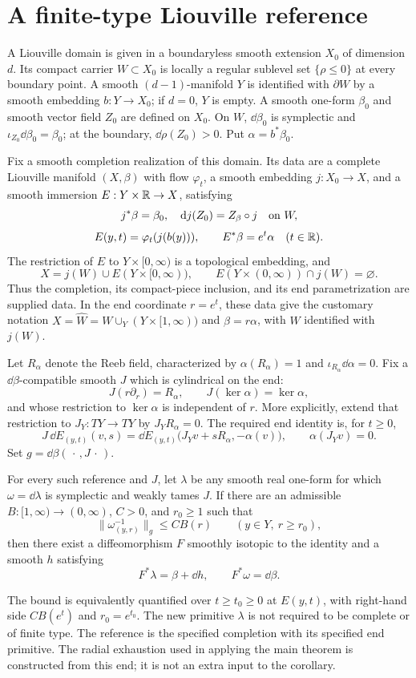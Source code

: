 \section{A finite-type Liouville reference}
A Liouville domain is given in a boundaryless smooth extension $X_0$
of dimension $d$. Its compact carrier $W\subset X_0$ is locally a
regular sublevel set $\{\rho\le0\}$ at every boundary point. A smooth
$(d-1)$-manifold $Y$ is identified with $\partial W$ by a smooth
embedding $b:Y\to X_0$; if $d=0$, $Y$ is empty. A smooth one-form
$\beta_0$ and smooth vector field $Z_0$ are defined on $X_0$.
On $W$, $\dd\beta_0$ is symplectic and
$\iota_{Z_0}\dd\beta_0=\beta_0$; at the boundary,
$\dd\rho(Z_0)>0$. Put $\alpha=b^*\beta_0$.

Fix a smooth completion realization of this domain. Its data are a
complete Liouville manifold $(X,\beta)$ with flow $\varphi_t$,
a smooth embedding $j:X_0\to X$, and a smooth immersion
$E:Y\times\mathbb R\to X$, satisfying
\[
 j^*\beta=\beta_0,\quad \mathrm d j(Z_0)=Z_\beta\circ j
 \quad\hbox{on }W,
\]
\[
 E(y,t)=\varphi_t(j(b(y))),\qquad E^*\beta=e^t\alpha
 \quad(t\in\mathbb R).
\]
The restriction of $E$ to $Y\times[0,\infty)$ is a topological
embedding, and
\[
 X=j(W)\cup E(Y\times[0,\infty)),\qquad
 E(Y\times(0,\infty))\cap j(W)=\varnothing .
\]
Thus the completion, its compact-piece inclusion, and its end
parametrization are supplied data. In the end coordinate $r=e^t$,
these data give the customary notation
$X=\widehat W=W\cup_Y(Y\times[1,\infty))$ and $\beta=r\alpha$,
with $W$ identified with $j(W)$.

Let $R_\alpha$ denote the Reeb field, characterized by
$\alpha(R_\alpha)=1$ and $\iota_{R_\alpha}\dd\alpha=0$.
Fix a $\dd\beta$-compatible smooth $J$ which is cylindrical on the end:
\[
 J(r\partial_r)=R_\alpha,\qquad J(\ker\alpha)=\ker\alpha,
\]
and whose restriction to $\ker\alpha$ is independent of $r$.
More explicitly, extend that restriction to $J_Y:TY\to TY$ by
$J_Y R_\alpha=0$. The required end identity is, for $t\ge0$,
\[
 J\,\dd E_{(y,t)}(v,s)
 =\dd E_{(y,t)}\bigl(J_Yv+sR_\alpha,-\alpha(v)\bigr),
 \qquad \alpha(J_Yv)=0.
\]
Set $g=\dd\beta(\,\cdot\,,J\,\cdot\,)$.

\begin{corollary}\label{cor:finite}
For every such reference and $J$, let $\lambda$ be any smooth real
one-form for which $\omega=\dd\lambda$ is symplectic and weakly
tames $J$. If there are an admissible $B:[1,\infty)\to(0,\infty)$,
$C>0$, and $r_0\ge1$ such that
\[
 \|\omega^{-1}_{(y,r)}\|_g\le C B(r)
 \qquad(y\in Y,\ r\ge r_0),
\]
then there exist a diffeomorphism $F$ smoothly isotopic to the identity
and a smooth $h$ satisfying
\[
 F^*\lambda=\beta+\dd h,\qquad F^*\omega=\dd\beta.
\]
\end{corollary}
The bound is equivalently quantified over $t\ge t_0\ge0$ at
$E(y,t)$, with right-hand side $C B(e^t)$ and $r_0=e^{t_0}$.
The new primitive $\lambda$ is not required to be complete or of
finite type. The reference is the specified completion with its
specified end primitive. The radial exhaustion used in applying the
main theorem is constructed from this end; it is not an extra input
to the corollary.

